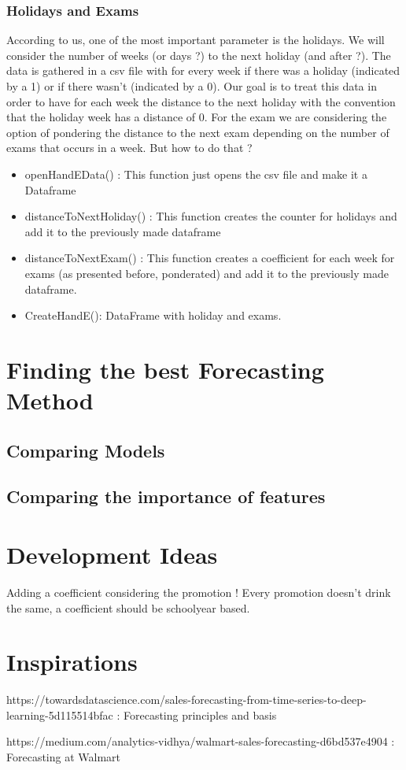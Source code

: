 \documentclass{report}
\begin{document}
\subsection{Holidays and Exams}

According to us, one of the most important parameter is the holidays. We will consider the number of weeks (or days ?) to the next holiday (and after ?). The data is gathered in a csv file with for every week if there was a holiday (indicated by a 1) or if there wasn't (indicated by a 0). Our goal is to treat this data in order to have for each week the distance to the next holiday with the convention that the holiday week has a distance of 0. 
For the exam we are considering the option of pondering the distance to the next exam depending on the number of exams that occurs in a week. But how to do that ?

\begin{itemize}
\item openHandEData() : This function just opens the csv file and make it a Dataframe
\item distanceToNextHoliday() : This function creates the counter for holidays and add it to the previously made dataframe
\item distanceToNextExam() : This function creates a coefficient for each week for exams (as presented before, ponderated) and add it to the previously made dataframe.
\item CreateHandE(): DataFrame with holiday and exams.
\end{itemize}


\chapter{Finding the best Forecasting Method}



\section{Comparing Models}



\section{Comparing the importance of features}


\chapter{Development Ideas}

Adding a coefficient considering the promotion ! Every promotion doesn't drink the same, a coefficient should be schoolyear based.

\chapter{Inspirations}

https://towardsdatascience.com/sales-forecasting-from-time-series-to-deep-learning-5d115514bfac : Forecasting principles and basis 

https://medium.com/analytics-vidhya/walmart-sales-forecasting-d6bd537e4904 : Forecasting at Walmart 
\end{document}
